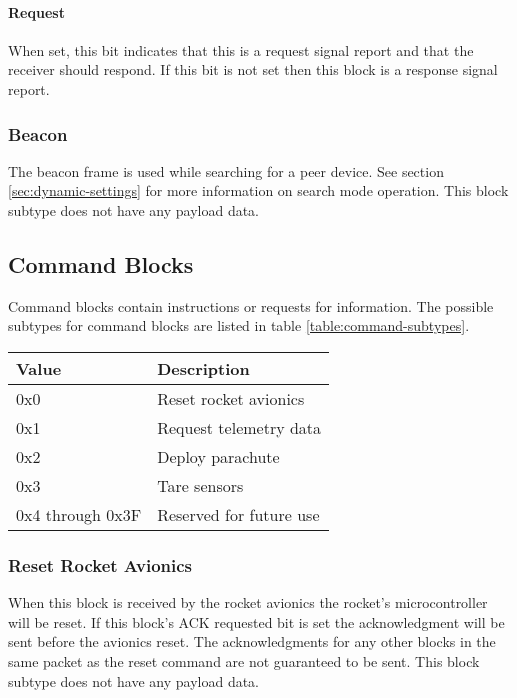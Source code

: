 \paragraph{Request}
When set, this bit indicates that this is a request signal report and that the receiver should respond. If this bit is
not set then this block is a response signal report.

\subsubsection{Beacon}
The beacon frame is used while searching for a peer device. See section \ref{sec:dynamic-settings} for more information
on search mode operation. This block subtype does not have any payload data.

\subsection{Command Blocks}
Command blocks contain instructions or requests for information. The possible subtypes for command blocks are listed in
table \ref{table:command-subtypes}.

\begin{table*}[htb]
    \centering
    \begin{tabular}{@{}ll@{}}
        \toprule
        Value            & Description             \\
        \midrule
        0x0              & Reset rocket avionics   \\
        0x1              & Request telemetry data  \\
        0x2              & Deploy parachute        \\
        0x3              & Tare sensors            \\
        0x4 through 0x3F & Reserved for future use \\
        \bottomrule
    \end{tabular}
    \caption{Command Block Subtypes}
    \label{table:command-subtypes}
\end{table*}

\subsubsection{Reset Rocket Avionics}
When this block is received by the rocket avionics the rocket’s microcontroller will be reset. If this block’s ACK
requested bit is set the acknowledgment will be sent before the avionics reset. The acknowledgments for any other
blocks in the same packet as the reset command are not guaranteed to be sent. This block subtype does not have any
payload data.

